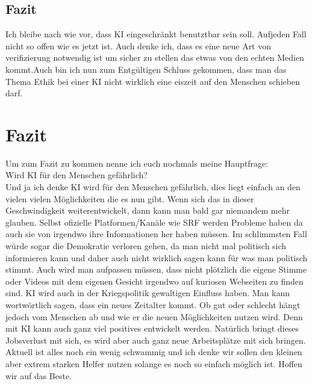 \subsection{Fazit}
Ich bleibe nach wie vor, dass KI eingeschränkt benutztbar sein soll. Aufjeden Fall nicht so offen wie es jetzt ist. Auch denke ich, dass es eine neue Art von verifizierung notwendig ist um sicher zu stellen das etwas von den echten Medien kommt.Auch bin ich nun zum Entgültigen Schluss gekommen, dass man das Thema Ethik bei einer KI nicht wirklich eine eiszeit auf den Menschen schieben darf.

\newpage
\section{Fazit}
Um zum Fazit zu kommen nenne ich euch nochmals meine Hauptfrage:
\\
Wird KI für den Menschen gefährlich?
\\
Und ja ich denke KI wird für den Menschen gefährlich, dies liegt einfach an den vielen vielen Möglichkeiten die es nun gibt.
Wenn sich das in dieser Geschwindigkeit weiterentwickelt, dann kann man bald gar niemandem mehr glauben. Selbst ofizielle Platformen/Kanäle wie SRF werden Probleme haben da auch sie von irgendwo ihre Informationen her haben müssen.
Im schlimmsten Fall würde sogar die Demokratie verloren gehen, da man nicht mal politisch sich informieren kann und daher auch nicht wirklich sagen kann für was man politisch stimmt.
Auch wird man aufpassen müssen, dass nicht plötzlich die eigene Stimme oder Videos mit dem eigenen Gesicht irgendwo auf kuriosen Webseiten zu finden sind. KI wird auch in der Kriegspolitik gewaltigen Einfluss haben.
Man kann wortwörtlich sagen, dass ein neues Zeitalter kommt. Ob gut oder schlecht hängt jedoch vom Menschen ab und wie er die neuen Möglichkeiten nutzen wird. Denn mit KI kann auch ganz viel positives entwickelt werden. Natürlich bringt dieses Jobsverlust mit sich, es wird aber auch ganz neue Arbeitsplätze mit sich bringen.
Aktuell ist alles noch ein wenig schwammig und ich denke wir sollen den kleinen aber extrem starken Helfer nutzen solange es noch so einfach möglich ist.
Hoffen wir auf das Beste.
